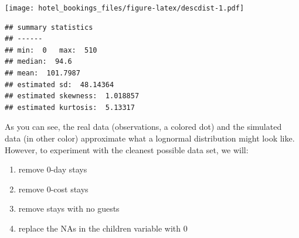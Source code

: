 \documentclass[
]{article}
\newenvironment{Shaded}{\begin{snugshade}}{\end{snugshade}}
\newcommand{\AttributeTok}[1]{\textcolor[rgb]{0.13,0.29,0.53}{#1}}
\newcommand{\DecValTok}[1]{\textcolor[rgb]{0.00,0.00,0.81}{#1}}
\newcommand{\FunctionTok}[1]{\textcolor[rgb]{0.13,0.29,0.53}{\textbf{#1}}}
\newcommand{\NormalTok}[1]{#1}
\newcommand{\OtherTok}[1]{\textcolor[rgb]{0.56,0.35,0.01}{#1}}
\newcommand{\SpecialCharTok}[1]{\textcolor[rgb]{0.81,0.36,0.00}{\textbf{#1}}}
\newcommand{\StringTok}[1]{\textcolor[rgb]{0.31,0.60,0.02}{#1}}
\providecommand{\tightlist}{%
  \setlength{\itemsep}{0pt}\setlength{\parskip}{0pt}}
\begin{document}
\begin{Shaded}
\end{Shaded}

\texttt{[image: hotel\_bookings\_files/figure-latex/descdist-1.pdf]}

\begin{verbatim}
## summary statistics
## ------
## min:  0   max:  510 
## median:  94.6 
## mean:  101.7987 
## estimated sd:  48.14364 
## estimated skewness:  1.018857 
## estimated kurtosis:  5.13317
\end{verbatim}

As you can see, the real data (observations, a colored dot) and the
simulated data (in other color) approximate what a lognormal
distribution might look like. However, to experiment with the cleanest
possible data set, we will:

\begin{enumerate}
\def\labelenumi{\arabic{enumi})}
\tightlist
\item
  remove 0-day stays
\item
  remove 0-cost stays
\item
  remove stays with no guests
\item
  replace the NAs in the children variable with 0
\end{enumerate}

\begin{Shaded}
\end{Shaded}
\end{document}
